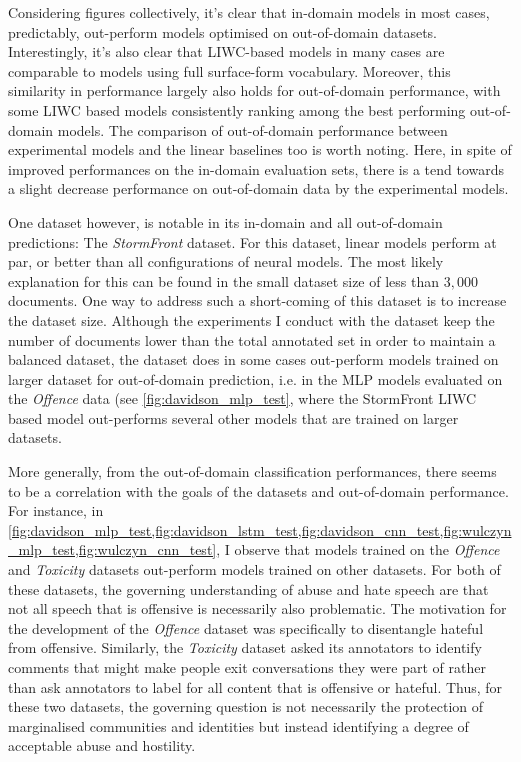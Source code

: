 Considering figures collectively, it's clear that in-domain models in most cases, predictably, out-perform models optimised on out-of-domain datasets. 
Interestingly, it's also clear that LIWC-based models in many cases are comparable to models using full surface-form vocabulary. 
Moreover, this similarity in performance largely also holds for out-of-domain performance, with some LIWC based models consistently ranking among the best performing out-of-domain models.
The comparison of out-of-domain performance between experimental models and the linear baselines too is worth noting.
Here, in spite of improved performances on the in-domain evaluation sets, there is a tend towards a slight decrease performance on out-of-domain data by the experimental models.

One dataset however, is notable in its in-domain and all out-of-domain predictions: The \textit{StormFront} dataset. 
For this dataset, linear models perform at par, or better than all configurations of neural models. 
The most likely explanation for this can be found in the small dataset size of less than $3,000$ documents. 
One way to address such a short-coming of this dataset is to increase the dataset size. 
Although the experiments I conduct with the dataset keep the number of documents lower than the total annotated set in order to maintain a balanced dataset, the dataset does in some cases out-perform models trained on larger dataset for out-of-domain prediction, i.e. in the MLP models evaluated on the \textit{Offence} data (see \cref{fig:davidson_mlp_test}, where the StormFront LIWC based model  out-performs several other models that are trained on larger datasets.

More generally, from the out-of-domain classification performances, there seems to be a correlation with the goals of the datasets and out-of-domain performance. 
For instance, in \cref{fig:davidson_mlp_test,fig:davidson_lstm_test,fig:davidson_cnn_test,fig:wulczyn_mlp_test,fig:wulczyn_cnn_test}, I observe that models trained on the \textit{Offence} and \textit{Toxicity} datasets out-perform models trained on other datasets. 
For both of these datasets, the governing understanding of abuse and hate speech are that not all speech that is offensive is necessarily also problematic.
The motivation for the development of the \textit{Offence} dataset was specifically to disentangle hateful from offensive.
Similarly, the \textit{Toxicity} dataset asked its annotators to identify comments that might make people exit conversations they were part of rather than ask annotators to label for all content that is offensive or hateful.
Thus, for these two datasets, the governing question is not necessarily the protection of marginalised communities and identities but instead identifying a degree of acceptable abuse and hostility.

